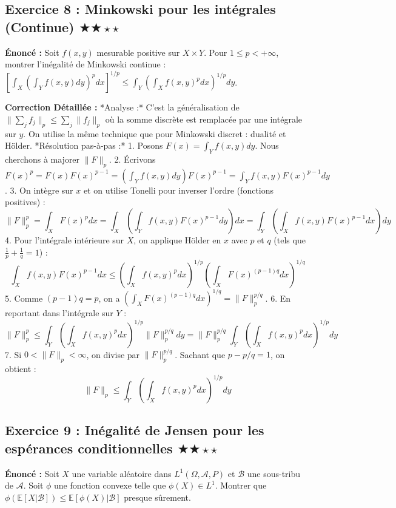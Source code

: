 \documentclass[11pt,a4paper]{article}
\begin{document}
\subsection*{Exercice 8 : Minkowski pour les intégrales (Continue) $\bigstar\bigstar\star\star$}

\textbf{Énoncé :} Soit $f(x,y)$ mesurable positive sur $X \times Y$. Pour $1 \le p < +\infty$, montrer l'inégalité de Minkowski continue :
$\left[ \int_X \left( \int_Y f(x,y) dy \right)^p dx \right]^{1/p} \le \int_Y \left( \int_X f(x,y)^p dx \right)^{1/p} dy$.

\textbf{Correction Détaillée :}
*Analyse :* C'est la généralisation de $\| \sum_j f_j \|_p \le \sum_j \| f_j \|_p$ où la somme discrète est remplacée par une intégrale sur $y$. On utilise la même technique que pour Minkowski discret : dualité et Hölder.
*Résolution pas-à-pas :*
1. Posons $F(x) = \int_Y f(x,y) dy$. Nous cherchons à majorer $\|F\|_p$.
2. Écrivons $F(x)^p = F(x) F(x)^{p-1} = \left(\int_Y f(x,y) dy\right) F(x)^{p-1} = \int_Y f(x,y) F(x)^{p-1} dy$.
3. On intègre sur $x$ et on utilise Tonelli pour inverser l'ordre (fonctions positives) :
   $$\|F\|_p^p = \int_X F(x)^p dx = \int_X \left( \int_Y f(x,y) F(x)^{p-1} dy \right) dx = \int_Y \left( \int_X f(x,y) F(x)^{p-1} dx \right) dy$$
4. Pour l'intégrale intérieure sur $X$, on applique Hölder en $x$ avec $p$ et $q$ (tels que $\frac{1}{p}+\frac{1}{q}=1$) :
   $$\int_X f(x,y) F(x)^{p-1} dx \le \left(\int_X f(x,y)^p dx\right)^{1/p} \left(\int_X F(x)^{(p-1)q} dx\right)^{1/q}$$
5. Comme $(p-1)q = p$, on a $\left(\int_X F(x)^{(p-1)q} dx\right)^{1/q} = \|F\|_p^{p/q}$.
6. En reportant dans l'intégrale sur $Y$ :
   $$\|F\|_p^p \le \int_Y \left(\int_X f(x,y)^p dx\right)^{1/p} \|F\|_p^{p/q} dy = \|F\|_p^{p/q} \int_Y \left(\int_X f(x,y)^p dx\right)^{1/p} dy$$
7. Si $0 < \|F\|_p < \infty$, on divise par $\|F\|_p^{p/q}$. Sachant que $p - p/q = 1$, on obtient :
   $$\|F\|_p \le \int_Y \left(\int_X f(x,y)^p dx\right)^{1/p} dy$$


\subsection*{Exercice 9 : Inégalité de Jensen pour les espérances conditionnelles $\bigstar\bigstar\star\star$}

\textbf{Énoncé :} Soit $X$ une variable aléatoire dans $L^1(\Omega, \mathcal{A}, P)$ et $\mathcal{B}$ une sous-tribu de $\mathcal{A}$. Soit $\phi$ une fonction convexe telle que $\phi(X) \in L^1$. Montrer que $\phi(\mathbb{E}[X|\mathcal{B}]) \le \mathbb{E}[\phi(X)|\mathcal{B}]$ presque sûrement.
\end{document}
